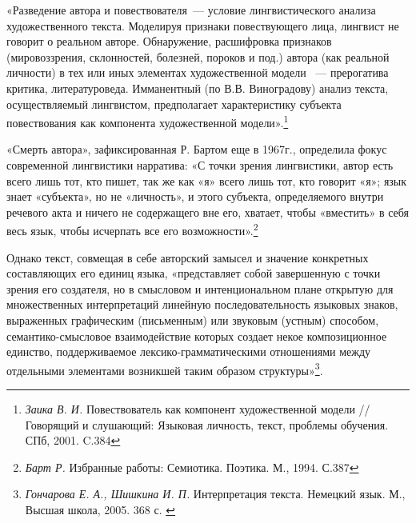 \documentclass{kursa4}
\begin{document}
{      «Разведение автора и повествователя~--- условие лингвистического
      анализа художественного текста. Моделируя признаки повествующего лица,
      лингвист не говорит о реальном авторе. Обнаружение, расшифровка
      признаков (мировоззрения, склонностей, болезней, пороков и под.) автора
      (как реальной личности) в тех или иных элементах художественной модели
     ~--- прерогатива критика, литературоведа. Имманентный (по В.В.
      Виноградову) анализ текста, осуществляемый лингвистом, предполагает
      характеристику субъекта повествования как компонента художественной
      модели».\footnote{\textit{{Заика В. И.
      }}{Повествователь как компонент художественной модели
      //Говорящий и слушающий: Языковая личность, текст, проблемы обучения.
      СПб, 2001. C.384}}

      «Смерть автора», зафиксированная Р. Бартом еще в 1967г., определила
      фокус современной лингвистики нарратива:\newline
      «С точки зрения лингвистики, автор есть всего лишь тот, кто пишет,
      так же как «я» всего лишь тот, кто говорит «я»; язык знает «субъекта»,
      но не «личность», и этого субъекта, определяемого внутри речевого акта
      и ничего не содержащего вне его, хватает, чтобы «вместить» в себя весь
      язык, чтобы исчерпать все его
      возможности».\footnote{\textit{{Барт
      Р.}}{ Избранные работы: Семиотика. Поэтика. М., 1994.
      С.387}}

      Однако текст, совмещая в себе авторский замысел и значение
      конкретных составляющих его единиц языка, «представляет собой
      завершенную с точки зрения его создателя, но в смысловом и
      интенциональном плане открытую для множественных интерпретаций линейную
      последовательность языковых знаков, выраженных графическим (письменным)
      или звуковым (устным) способом, семантико-смысловое взаимодействие
      которых создает некое композиционное единство, поддерживаемое
      лексико-грамматическими отношениями между отдельными элементами
      возникшей таким образом
      структуры»\footnote{\textit{{Гончарова Е. А., Шишкина
      И. П. }}{Интерпретация текста. Немецкий язык. М.,
      Высшая школа, 2005. 368 с. }}.

}
\end{document}

